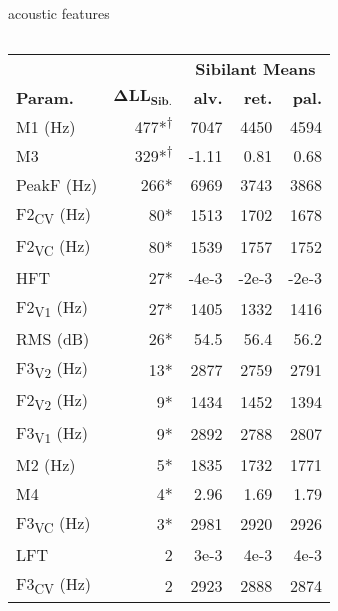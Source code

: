 \documentclass[serif, mathserif, final, xcolor=table]{beamer}
\begin{document}
\begin{frame}[t]{}
\begin{columns}[t]
\begin{column}{0.72\linewidth}
\begin{columns}[t]
\begin{column}{0.69\linewidth}
\begin{block}{acoustic features}
\begin{columns}
\begin{column}{0.3\linewidth}
                \small
                \begin{tabular}{lr|rrr}
                  \toprule
                        & \multicolumn{1}{c}{} & \multicolumn{3}{c}{\textbf{Sibilant Means}} \\
                  \cmidrule(lr){3-5}
                  \textbf{Param.} & \multicolumn{1}{r}{$\boldsymbol{\Delta LL_{Sib.}}$} & \textbf{alv.} & \textbf{ret.} & \textbf{pal.} \\
                  \midrule
                  M1 (Hz)    & 477*\textsuperscript{$\dagger$} & 7047  & 4450 & 4594 \\
                  M3         & 329*\textsuperscript{$\dagger$} & -1.11 & 0.81 & 0.68 \\
                  PeakF (Hz) & 266*\phantom{*} & 6969  & 3743 & 3868 \\
                  F2\textsubscript{CV} (Hz)  & 80*\phantom{*} & 1513 & 1702 & 1678 \\
                  F2\textsubscript{VC} (Hz) & 80*\phantom{*} & 1539 & 1757 & 1752 \\
                  HFT        & 27*\phantom{*}  & -4e-3 & -2e-3 & -2e-3 \\
                  F2\textsubscript{V1} (Hz) & 27*\phantom{*} & 1405 & 1332 & 1416 \\
                  RMS (dB)   & 26*\phantom{*}  & 54.5  & 56.4 & 56.2 \\
                  F3\textsubscript{V2} (Hz)  & 13*\phantom{*} & 2877 & 2759 & 2791 \\
                  F2\textsubscript{V2} (Hz) & 9*\phantom{*} & 1434 & 1452 & 1394 \\
                  F3\textsubscript{V1} (Hz) & 9*\phantom{*} & 2892 & 2788 & 2807 \\
                  M2 (Hz)    & 5*\phantom{*} & 1835 & 1732 & 1771 \\
                  M4         & 4*\phantom{*} & 2.96 & 1.69 & 1.79 \\
                  F3\textsubscript{VC} (Hz) & 3*\phantom{*} & 2981 & 2920 & 2926 \\
                  LFT        & 2\phantom{**} & 3e-3 & 4e-3 & 4e-3 \\
                  F3\textsubscript{CV} (Hz) & 2\phantom{**} & 2923 & 2888 & 2874 \\
                  \bottomrule
                  \end{tabular}

                  \bigskip


\end{column}
\end{columns}
\end{block}
\end{column}
\end{columns}
\end{column}
\end{columns}
\end{frame}
\end{document}
